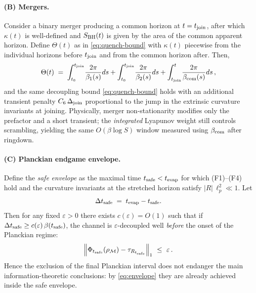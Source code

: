 \paragraph{(B) Mergers.}
Consider a binary merger producing a common horizon at $t=t_{\rm join}$, after which $\kappa(t)$ is well-defined and $S_{\rm BH}(t)$ is given by the area of the common apparent horizon. Define $\Theta(t)$ as in \eqref{eq:quench-bound} with $\kappa(t)$ piecewise from the individual horizons before $t_{\rm join}$ and from the common horizon after. Then,
\begin{equation}
  \Theta(t)
  \;=\; \int_{t_0}^{t_{\rm join}}\!\frac{2\pi}{\beta_1(s)}ds
       + \int_{t_0}^{t_{\rm join}}\!\frac{2\pi}{\beta_2(s)}ds
       + \int_{t_{\rm join}}^{t}\!\frac{2\pi}{\beta_{\rm com}(s)}ds\,,
  \label{eq:Theta-merger}
\end{equation}
and the same decoupling bound \eqref{eq:quench-bound} holds with an additional transient penalty $C_6 \,\Delta_{\rm join}$ proportional to the jump in the extrinsic curvature invariants at joining. Physically, merger non-stationarity modifies only the prefactor and a short transient; the \emph{integrated} Lyapunov weight still controls scrambling, yielding the same $O(\beta\log S)$ window measured using $\beta_{\rm com}$ after ringdown.

\paragraph{(C) Planckian endgame envelope.}
Define the \emph{safe envelope} as the maximal time $t_{\rm safe}<t_{\rm evap}$ for which (F1)--(F4) hold and the curvature invariants at the stretched horizon satisfy $|R|\,\ell_p^2\ll 1$. Let
\[
  \Delta t_{\rm safe}\;=\; t_{\rm evap}-t_{\rm safe}.
\]
Then for any fixed $\varepsilon>0$ there exists $c(\varepsilon)=O(1)$ such that if $\Delta t_{\rm safe}\ge c(\varepsilon)\,\beta(t_{\rm safe})$, the channel is $\varepsilon$-decoupled well \emph{before} the onset of the Planckian regime:
\begin{equation}
  \left\| \Phi_{t_{\rm safe}}(\rho_{\mathcal{M}})-\tau_{R_{t_{\rm safe}}}\right\|_1 \ \le\ \varepsilon\,.
  \label{eq:envelope}
\end{equation}
Hence the exclusion of the final Planckian interval does not endanger the main information-theoretic conclusions: by \eqref{eq:envelope} they are already achieved inside the safe envelope.

\bigskip
